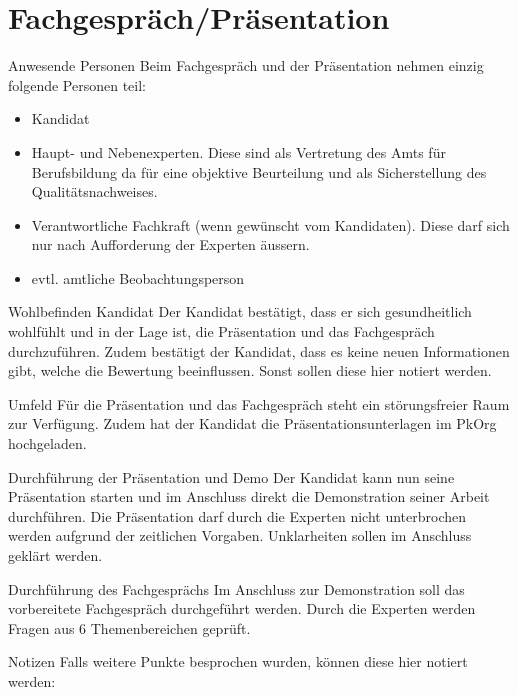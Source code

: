 \section{Fachgespräch/Präsentation}

\begin{taskitemwithoutcomment}{Anwesende Personen}
Beim Fachgespräch und der Präsentation nehmen einzig folgende Personen teil:
\begin{itemize}
    \item Kandidat
    \item Haupt- und Nebenexperten. Diese sind als Vertretung des Amts für Berufsbildung da für eine objektive Beurteilung und
          als Sicherstellung des Qualitätsnachweises.
    \item Verantwortliche Fachkraft (wenn gewünscht vom Kandidaten). Diese darf sich nur nach Aufforderung der Experten äussern.
    \item evtl. amtliche Beobachtungsperson
\end{itemize}
\end{taskitemwithoutcomment}

\begin{taskitem}{Wohlbefinden Kandidat}
Der Kandidat bestätigt, dass er sich gesundheitlich wohlfühlt und in der Lage ist, die Präsentation und das Fachgespräch durchzuführen.
Zudem bestätigt der Kandidat, dass es keine neuen Informationen gibt, welche die Bewertung beeinflussen. Sonst sollen diese hier notiert werden.
\end{taskitem}

\begin{taskitem}{Umfeld}
Für die Präsentation und das Fachgespräch steht ein störungsfreier Raum zur Verfügung. Zudem hat der Kandidat die Präsentationsunterlagen
im PkOrg hochgeladen.
\end{taskitem}

\begin{taskitem}{Durchführung der Präsentation und Demo}
Der Kandidat kann nun seine Präsentation starten und im Anschluss direkt die Demonstration seiner Arbeit durchführen. Die Präsentation
darf durch die Experten nicht unterbrochen werden aufgrund der zeitlichen Vorgaben. Unklarheiten sollen im Anschluss geklärt werden.
\end{taskitem}

\begin{taskitemwithoutcomment}{Durchführung des Fachgesprächs}
Im Anschluss zur Demonstration soll das vorbereitete Fachgespräch durchgeführt werden. Durch die Experten werden Fragen aus 6 Themenbereichen geprüft.
\end{taskitemwithoutcomment}

\begin{taskitem}{Notizen}
Falls weitere Punkte besprochen wurden, können diese hier notiert werden:
\end{taskitem}

\clearpage
